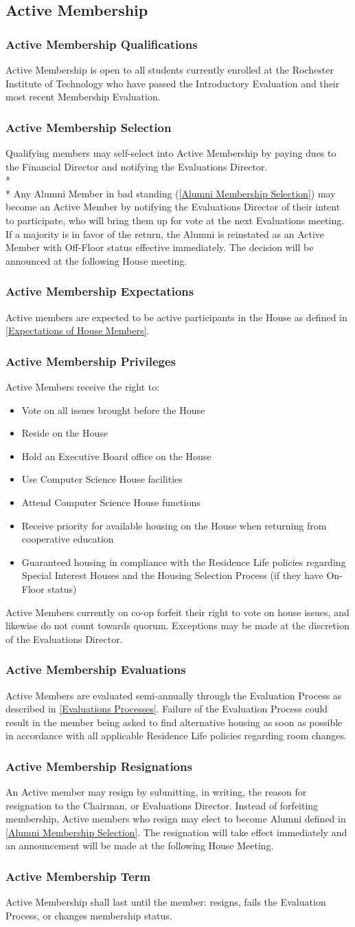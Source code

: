 \documentclass{article}
\newcommand{\asection}[1]{\subsection{#1} \label{#1}}
\newcommand{\asubsection}[1]{\subsubsection{#1} \label{#1}}
\begin{document}
\asection{Active Membership}
\asubsection{Active Membership Qualifications}
Active Membership is open to all students currently enrolled at the Rochester Institute of Technology who have passed the Introductory Evaluation and their most recent Membership Evaluation.
\asubsection{Active Membership Selection}
Qualifying members may self-select into Active Membership by paying dues to the Financial Director and notifying the Evaluations Director.
\\*\\*
Any Alumni Member in bad standing (\ref{Alumni Membership Selection}) may become an Active Member by notifying the Evaluations Director of their intent to participate, who will bring them up for vote at the next Evaluations meeting.
If a majority is in favor of the return, the Alumni is reinstated as an Active Member with Off-Floor status effective immediately.
The decision will be announced at the following House meeting.
\asubsection{Active Membership Expectations}
Active members are expected to be active participants in the House as defined in \ref{Expectations of House Members}.
\asubsection{Active Membership Privileges}
Active Members receive the right to:
\begin{itemize}
	\item Vote on all issues brought before the House
	\item Reside on the House
	\item Hold an Executive Board office on the House
	\item Use Computer Science House facilities
	\item Attend Computer Science House functions
	\item Receive priority for available housing on the House when returning from cooperative education
	\item Guaranteed housing in compliance with the Residence Life policies regarding Special Interest Houses and the Housing Selection Process (if they have On-Floor status)
\end{itemize}
Active Members currently on co-op forfeit their right to vote on house issues, and likewise do not count towards quorum.
Exceptions may be made at the discretion of the Evaluations Director.
\asubsection{Active Membership Evaluations}
Active Members are evaluated semi-annually through the Evaluation Process as described in \ref{Evaluations Processes}.
Failure of the Evaluation Process could result in the member being asked to find alternative housing as soon as possible in accordance with all applicable Residence Life policies regarding room changes.
\asubsection{Active Membership Resignations}
An Active member may resign by submitting, in writing, the reason for resignation to the Chairman, or Evaluations Director.
Instead of forfeiting membership, Active members who resign may elect to become Alumni defined in \ref{Alumni Membership Selection}.
The resignation will take effect immediately and an announcement will be made at the following House Meeting.
\asubsection{Active Membership Term}
Active Membership shall last until the member: resigns, fails the Evaluation Process, or changes membership status.
\end{document}
